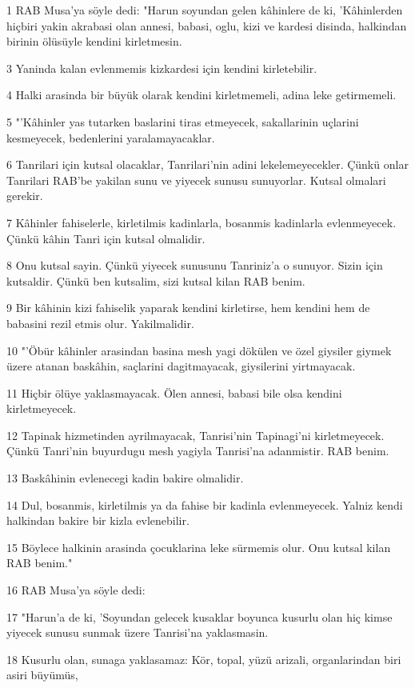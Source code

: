 \par 1 RAB Musa'ya söyle dedi: "Harun soyundan gelen kâhinlere de ki, 'Kâhinlerden hiçbiri yakin akrabasi olan annesi, babasi, oglu, kizi ve kardesi disinda, halkindan birinin ölüsüyle kendini kirletmesin.
\par 3 Yaninda kalan evlenmemis kizkardesi için kendini kirletebilir.
\par 4 Halki arasinda bir büyük olarak kendini kirletmemeli, adina leke getirmemeli.
\par 5 "'Kâhinler yas tutarken baslarini tiras etmeyecek, sakallarinin uçlarini kesmeyecek, bedenlerini yaralamayacaklar.
\par 6 Tanrilari için kutsal olacaklar, Tanrilari'nin adini lekelemeyecekler. Çünkü onlar Tanrilari RAB'be yakilan sunu ve yiyecek sunusu sunuyorlar. Kutsal olmalari gerekir.
\par 7 Kâhinler fahiselerle, kirletilmis kadinlarla, bosanmis kadinlarla evlenmeyecek. Çünkü kâhin Tanri için kutsal olmalidir.
\par 8 Onu kutsal sayin. Çünkü yiyecek sunusunu Tanriniz'a o sunuyor. Sizin için kutsaldir. Çünkü ben kutsalim, sizi kutsal kilan RAB benim.
\par 9 Bir kâhinin kizi fahiselik yaparak kendini kirletirse, hem kendini hem de babasini rezil etmis olur. Yakilmalidir.
\par 10 "'Öbür kâhinler arasindan basina mesh yagi dökülen ve özel giysiler giymek üzere atanan baskâhin, saçlarini dagitmayacak, giysilerini yirtmayacak.
\par 11 Hiçbir ölüye yaklasmayacak. Ölen annesi, babasi bile olsa kendini kirletmeyecek.
\par 12 Tapinak hizmetinden ayrilmayacak, Tanrisi'nin Tapinagi'ni kirletmeyecek. Çünkü Tanri'nin buyurdugu mesh yagiyla Tanrisi'na adanmistir. RAB benim.
\par 13 Baskâhinin evlenecegi kadin bakire olmalidir.
\par 14 Dul, bosanmis, kirletilmis ya da fahise bir kadinla evlenmeyecek. Yalniz kendi halkindan bakire bir kizla evlenebilir.
\par 15 Böylece halkinin arasinda çocuklarina leke sürmemis olur. Onu kutsal kilan RAB benim."
\par 16 RAB Musa'ya söyle dedi:
\par 17 "Harun'a de ki, 'Soyundan gelecek kusaklar boyunca kusurlu olan hiç kimse yiyecek sunusu sunmak üzere Tanrisi'na yaklasmasin.
\par 18 Kusurlu olan, sunaga yaklasamaz: Kör, topal, yüzü arizali, organlarindan biri asiri büyümüs,

